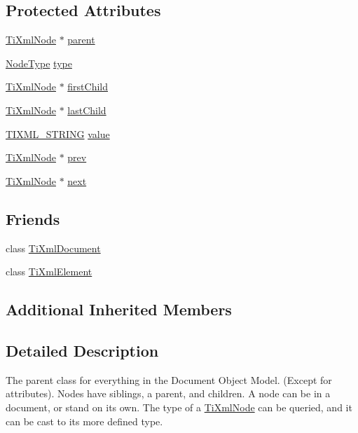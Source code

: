 \subsection*{Protected Attributes}
\begin{DoxyCompactItemize}
\item 
\hyperlink{class_ti_xml_node}{Ti\-Xml\-Node} $\ast$ \hyperlink{class_ti_xml_node_a662c4de61244e4fa5bd4e2d8c63143a5}{parent}
\item 
\hyperlink{class_ti_xml_node_a836eded4920ab9e9ef28496f48cd95a2}{Node\-Type} \hyperlink{class_ti_xml_node_a2619c6379181c16ba95ae6922e2ca839}{type}
\item 
\hyperlink{class_ti_xml_node}{Ti\-Xml\-Node} $\ast$ \hyperlink{class_ti_xml_node_af749fb7f22010b80e8f904c32653d50e}{first\-Child}
\item 
\hyperlink{class_ti_xml_node}{Ti\-Xml\-Node} $\ast$ \hyperlink{class_ti_xml_node_a5b30756d21b304580d22a841ec9d61f8}{last\-Child}
\item 
\hyperlink{tinyxml_8h_a92bada05fd84d9a0c9a5bbe53de26887}{T\-I\-X\-M\-L\-\_\-\-S\-T\-R\-I\-N\-G} \hyperlink{class_ti_xml_node_aead528b3cedc33c16a6c539872c7cc8b}{value}
\item 
\hyperlink{class_ti_xml_node}{Ti\-Xml\-Node} $\ast$ \hyperlink{class_ti_xml_node_a9c5370ea2cbfd9f0e0f7b30a57fd68f5}{prev}
\item 
\hyperlink{class_ti_xml_node}{Ti\-Xml\-Node} $\ast$ \hyperlink{class_ti_xml_node_a2f329cc993d2d34df76e17dcbb776b45}{next}
\end{DoxyCompactItemize}
\subsection*{Friends}
\begin{DoxyCompactItemize}
\item 
class \hyperlink{class_ti_xml_node_a173617f6dfe902cf484ce5552b950475}{Ti\-Xml\-Document}
\item 
class \hyperlink{class_ti_xml_node_ab6592e32cb9132be517cc12a70564c4b}{Ti\-Xml\-Element}
\end{DoxyCompactItemize}
\subsection*{Additional Inherited Members}


\subsection{Detailed Description}
The parent class for everything in the Document Object Model. (Except for attributes). Nodes have siblings, a parent, and children. A node can be in a document, or stand on its own. The type of a \hyperlink{class_ti_xml_node}{Ti\-Xml\-Node} can be queried, and it can be cast to its more defined type. 


